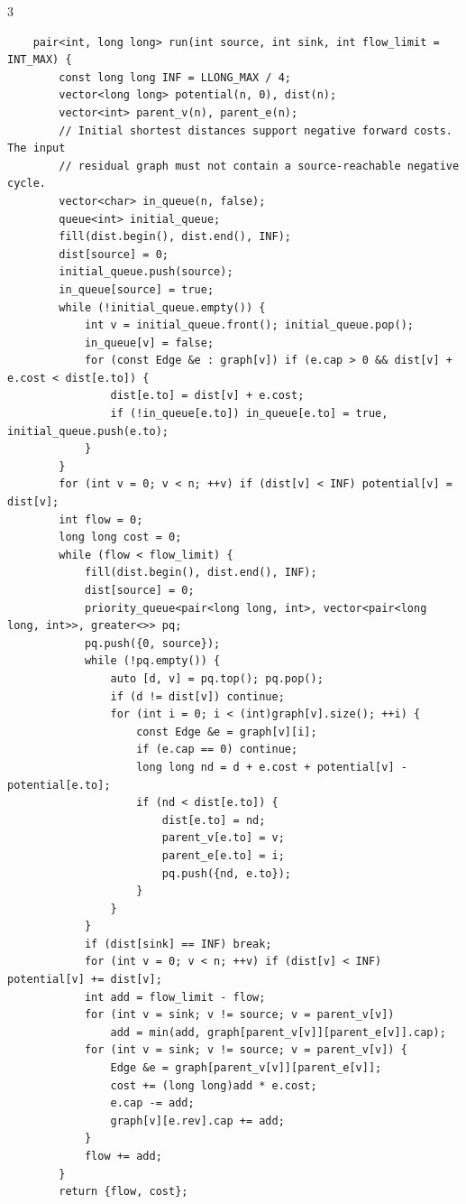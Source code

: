 \documentclass[8pt,a4paper,landscape]{article}
\begin{document}
\begin{multicols}{3}
\begin{lstlisting}
    pair<int, long long> run(int source, int sink, int flow_limit = INT_MAX) {
        const long long INF = LLONG_MAX / 4;
        vector<long long> potential(n, 0), dist(n);
        vector<int> parent_v(n), parent_e(n);
        // Initial shortest distances support negative forward costs. The input
        // residual graph must not contain a source-reachable negative cycle.
        vector<char> in_queue(n, false);
        queue<int> initial_queue;
        fill(dist.begin(), dist.end(), INF);
        dist[source] = 0;
        initial_queue.push(source);
        in_queue[source] = true;
        while (!initial_queue.empty()) {
            int v = initial_queue.front(); initial_queue.pop();
            in_queue[v] = false;
            for (const Edge &e : graph[v]) if (e.cap > 0 && dist[v] + e.cost < dist[e.to]) {
                dist[e.to] = dist[v] + e.cost;
                if (!in_queue[e.to]) in_queue[e.to] = true, initial_queue.push(e.to);
            }
        }
        for (int v = 0; v < n; ++v) if (dist[v] < INF) potential[v] = dist[v];
        int flow = 0;
        long long cost = 0;
        while (flow < flow_limit) {
            fill(dist.begin(), dist.end(), INF);
            dist[source] = 0;
            priority_queue<pair<long long, int>, vector<pair<long long, int>>, greater<>> pq;
            pq.push({0, source});
            while (!pq.empty()) {
                auto [d, v] = pq.top(); pq.pop();
                if (d != dist[v]) continue;
                for (int i = 0; i < (int)graph[v].size(); ++i) {
                    const Edge &e = graph[v][i];
                    if (e.cap == 0) continue;
                    long long nd = d + e.cost + potential[v] - potential[e.to];
                    if (nd < dist[e.to]) {
                        dist[e.to] = nd;
                        parent_v[e.to] = v;
                        parent_e[e.to] = i;
                        pq.push({nd, e.to});
                    }
                }
            }
            if (dist[sink] == INF) break;
            for (int v = 0; v < n; ++v) if (dist[v] < INF) potential[v] += dist[v];
            int add = flow_limit - flow;
            for (int v = sink; v != source; v = parent_v[v])
                add = min(add, graph[parent_v[v]][parent_e[v]].cap);
            for (int v = sink; v != source; v = parent_v[v]) {
                Edge &e = graph[parent_v[v]][parent_e[v]];
                cost += (long long)add * e.cost;
                e.cap -= add;
                graph[v][e.rev].cap += add;
            }
            flow += add;
        }
        return {flow, cost};

\end{lstlisting}
\end{multicols}
\end{document}
